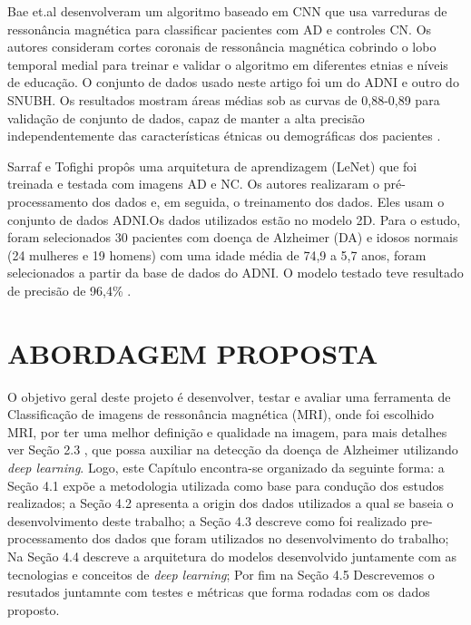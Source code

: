 \documentclass[openright]{UFRGS} %
\begin{document}
Bae et.al desenvolveram um algoritmo baseado em CNN que usa varreduras de ressonância magnética para classificar pacientes com AD e controles CN. Os autores consideram cortes coronais de ressonância magnética cobrindo o lobo temporal medial para treinar e validar o algoritmo em diferentes etnias e níveis de educação. O conjunto de dados usado neste artigo foi um do ADNI e outro do SNUBH. Os resultados mostram áreas médias sob as curvas de 0,88-0,89 para validação de conjunto de dados, capaz de manter a alta precisão independentemente das características étnicas ou demográficas dos pacientes \cite{bae2020identification}.


Sarraf e Tofighi propôs uma arquitetura de aprendizagem (LeNet) que foi treinada e testada com imagens AD e NC. Os autores realizaram o pré-processamento dos dados e, em seguida, o treinamento dos dados. Eles usam o conjunto de dados ADNI.Os dados utilizados estão no modelo 2D. 
Para o estudo, foram selecionados 30 pacientes com doença de Alzheimer (DA) e
idosos normais (24 mulheres e 19 homens)  com
uma idade média de 74,9 a 5,7 anos,  foram selecionados a partir da base de dados do ADNI. O modelo testado  teve resultado de precisão de 96,4\% \cite{sarraf2016classification}.

 

\chapter{ABORDAGEM PROPOSTA}

O objetivo geral deste projeto é desenvolver, testar e avaliar uma ferramenta de Classificação de imagens de ressonância magnética (MRI), onde foi escolhido MRI, por ter uma melhor definição e qualidade na imagem, para mais detalhes ver Seção 2.3
, que possa auxiliar na detecção da doença de Alzheimer utilizando  \textit{deep learning}. Logo,
este Capítulo encontra-se organizado da seguinte forma: a Seção 4.1 expõe a metodologia utilizada como base para condução dos estudos realizados; a Seção 4.2 apresenta a  origin dos dados utilizados
a qual se baseia o desenvolvimento deste trabalho; a Seção 4.3 descreve como
foi realizado pre-processamento dos dados que foram utilizados no desenvolvimento do trabalho; Na
Seção 4.4 descreve a arquitetura do modelos desenvolvido juntamente com as tecnologias e conceitos de \textit{deep learning}; Por fim na
Seção 4.5  Descrevemos o resutados juntamnte com testes e métricas que forma rodadas
com os dados proposto.
\end{document}
